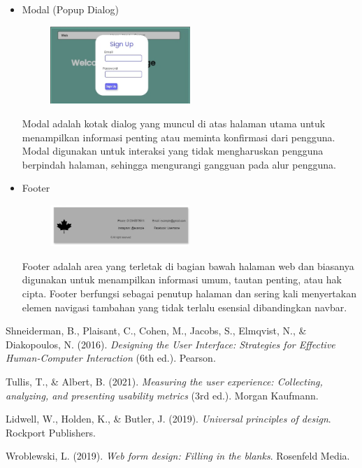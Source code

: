 \documentclass[12pt]{article}
\begin{document}
\begin{itemize}
    \item Modal (Popup Dialog)
\begin{figure}[h] %
    \centering
    \includegraphics[width=0.5\textwidth]{asset/popUp.png }
\end{figure}
    \par Modal adalah kotak dialog yang muncul di atas halaman utama untuk menampilkan informasi penting atau meminta konfirmasi dari pengguna. Modal digunakan untuk interaksi yang tidak mengharuskan pengguna berpindah halaman, sehingga mengurangi gangguan pada alur pengguna.

    \item Footer
\begin{figure}[h] %
    \centering
    \includegraphics[width=0.5\textwidth]{asset/footer.png }
\end{figure}
    \par Footer adalah area yang terletak di bagian bawah halaman web dan biasanya digunakan untuk menampilkan informasi umum, tautan penting, atau hak cipta. Footer berfungsi sebagai penutup halaman dan sering kali menyertakan elemen navigasi tambahan yang tidak terlalu esensial dibandingkan navbar.
\end{itemize}

\begin{thebibliography}{9} 

Shneiderman, B., Plaisant, C., Cohen, M., Jacobs, S., Elmqvist, N., \& Diakopoulos, N. (2016). \textit{Designing the User Interface: Strategies for Effective Human-Computer Interaction} (6th ed.). Pearson.

Tullis, T., \& Albert, B. (2021). \textit{Measuring the user experience: Collecting, analyzing, and presenting usability metrics} (3rd ed.). Morgan Kaufmann.

Lidwell, W., Holden, K., \& Butler, J. (2019). \textit{Universal principles of design}. Rockport Publishers.

Wroblewski, L. (2019). \textit{Web form design: Filling in the blanks}. Rosenfeld Media.

			

\end{thebibliography}
\end{document}
